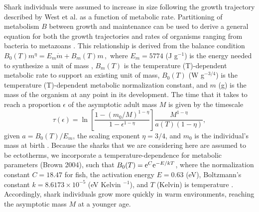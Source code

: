 \documentclass[]{rsos}%
\begin{document}
Shark individuals were assumed to increase in size following the growth trajectory described by West et al. \cite{West:2001bv} as a function of metabolic rate.
Partitioning of metabolism $B$ between growth and maintenance can be used to derive a general equation for both the
growth trajectories and rates of organisms ranging from bacteria to
metazoans
\cite{West:2001bv,moses2008rmo,gillooly2002esa,hou,Kempes:2012hy}. 
This relationship is derived from the balance condition 
$B_{0}(T)m^{\eta}=E_{m}\dot{m}+B_{m}(T)m\,,$
\cite{West:2001bv,moses2008rmo,gillooly2002esa,hou,Kempes:2012hy} where $E_{m} = 5774$ (J g${}^{-1}$) is the energy needed to synthesize a unit of mass \cite{moses2008rmo,hou,Pirt1965,Heijnen1981}, $B_{m}(T)$ is the temperature (T)-dependent metabolic rate to support an existing unit of mass, $B_0(T)$ (W g${}^{-3/4}$) is the temperature (T)-dependent metabolic normalization constant, and $m$ (g) is the mass of the organism at any point in its development.
The time that it takes to reach a proportion $\epsilon$ of the asymptotic adult mass $M$ is given by the timescale
\begin{equation}
\label{t1}
\tau\left(\epsilon\right) = \ln\left[\frac{1-\left(m_{0}/M\right)^{1-\eta}}{1-\epsilon^{1-\eta}}\right]\frac{M^{1-\eta}}{a(T)\left(1-\eta\right)},
\end{equation}
given $a=B_0(T)/E_m$, the scaling exponent $\eta = 3/4$, and $m_0$ is the individual's mass at birth \cite{Yeakel2018}. 
Because the sharks that we are considering here are assumed to be ectotherms, we incorporate a temperature-dependence for metabolic parameters (Brown 2004), such that $B_0(T) = {\rm e}^C{\rm e}^{-E/kT}$, where the normalization constant $C=18.47$ for fish, the activation energy $E=0.63$ (eV), Boltzmann's constant $k=8.6173\times 10^{-5}$ (eV Kelvin ${}^{-1}$), and $T$ (Kelvin) is temperature \cite{Brown2004}.
Accordingly, shark individuals grow more quickly in warm environments, reaching the asymptotic mass $M$ at a younger age.
\end{document}

